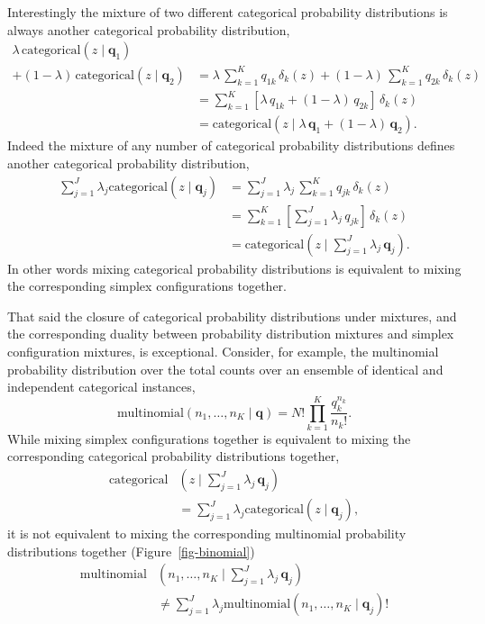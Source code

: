 \documentclass[
  letterpaper,
  DIV=11,
  numbers=noendperiod]{scrartcl}
\begin{document}
Interestingly the mixture of two different categorical probability
distributions is always another categorical probability distribution,
\begin{align*}
\lambda \, \mathrm{categorical}( z \mid \mathbf{q}_{1}) &
\\
+
(1 - \lambda) \, \mathrm{categorical}( z \mid \mathbf{q}_{2})
&=
\lambda \, \sum_{k = 1}^{K} q_{1k} \, \delta_{ k }( z )
+
(1 - \lambda) \, \sum_{k = 1}^{K} q_{2k} \, \delta_{ k }( z )
\\
&=
\sum_{k = 1}^{K}
\left[ \lambda \, q_{1k} + (1 - \lambda) \, q_{2k} \right]
\, \delta_{ k }( z )
\\
&=
\mathrm{categorical}( z \mid
\lambda \, \mathbf{q}_{1} + (1 - \lambda) \, \mathbf{q}_{2}).
\end{align*} Indeed the mixture of any number of categorical probability
distributions defines another categorical probability distribution,
\begin{align*}
\sum_{j = 1}^{J}
\lambda_{j} \mathrm{categorical}( z \mid \mathbf{q}_{j} )
&=
\sum_{j = 1}^{J} \lambda_{j} \,
\sum_{k = 1}^{K} q_{jk} \, \delta_{ k }( z )
\\
&=
\sum_{k = 1}^{K}
\left[ \sum_{j = 1}^{J} \lambda_{j} \, q_{jk} \right] \,
\delta_{ k }( z )
\\
&=
\mathrm{categorical}( z \mid
\textstyle \sum_{j = 1}^{J} \lambda_{j} \, \mathbf{q}_{j} ).
\end{align*} In other words mixing categorical probability distributions
is equivalent to mixing the corresponding simplex configurations
together.

That said the closure of categorical probability distributions under
mixtures, and the corresponding duality between probability distribution
mixtures and simplex configuration mixtures, is exceptional. Consider,
for example, the multinomial probability distribution over the total
counts over an ensemble of identical and independent categorical
instances, \[
\mathrm{multinomial}( n_{1}, \ldots, n_{K} \mid \mathbf{q})
=
N! \prod_{k = 1}^{K} \frac{ q_{k}^{n_{k}} }{ n_{k}! }.
\] While mixing simplex configurations together is equivalent to mixing
the corresponding categorical probability distributions together,
\begin{align*}
\mathrm{categorical} & ( z \mid
\textstyle \sum_{j = 1}^{J} \lambda_{j} \, \mathbf{q}_{j} )
\\
&=
\sum_{j = 1}^{J}
\lambda_{j} \mathrm{categorical}( z \mid \mathbf{q}_{j} ),
\end{align*} it is not equivalent to mixing the corresponding
multinomial probability distributions together
(Figure~\ref{fig-binomial}) \begin{align*}
\mathrm{multinomial} & ( n_{1}, \ldots, n_{K} \mid
\textstyle \sum_{j = 1}^{J} \lambda_{j} \, \mathbf{q}_{j} )
\\
&\ne
\sum_{j = 1}^{J} \lambda_{j}
\mathrm{multinomial}( n_{1}, \ldots, n_{K} \mid \mathbf{q}_{j})!
\end{align*}
\end{document}
